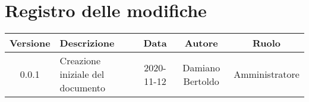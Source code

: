 \section*{Registro delle modifiche}

\begin{center}
	\begin{longtable}{|c|p{5cm}|c|c|c|}
	\hline
	\rowcolor{lighter-grayer}
	\textbf{Versione} & \textbf{Descrizione} & \textbf{Data} & \textbf{Autore} & \textbf{Ruolo} \\
	\hline
	\endfirsthead


	\hline
	0.0.1 & Creazione iniziale del documento & 2020-11-12 & Damiano Bertoldo & Amministratore \\
	\hline
	\end{longtable}
\end{center}